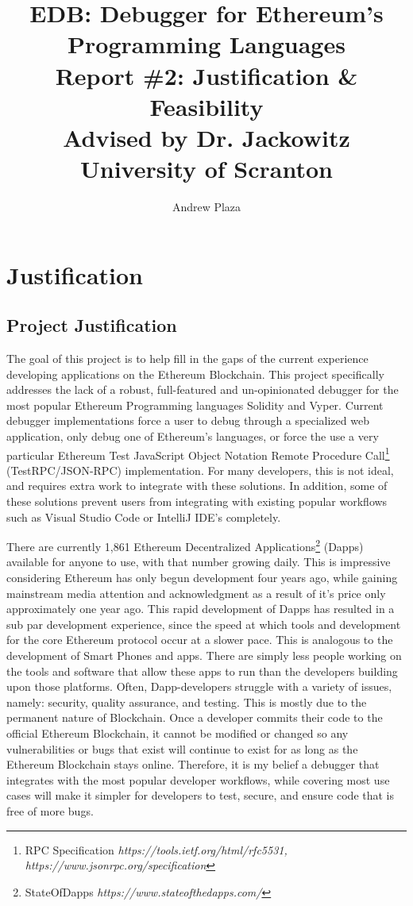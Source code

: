 \documentclass[]{report}
\title{%
	EDB: Debugger for Ethereum's Programming Languages \\
	\medskip
	\large Report \#2: Justification \& Feasibility \\
	\large Advised by Dr. Jackowitz	\\
	\large University of Scranton}
\author{Andrew Plaza}
\begin{document}
\maketitle
\tableofcontents
\newpage

\section {Justification}
\subsection{Project Justification}
The goal of this project is to help fill in the gaps of the current experience developing applications on the Ethereum Blockchain. This project specifically addresses the lack of a robust, full-featured and un-opinionated debugger for the most popular Ethereum Programming languages Solidity and Vyper. Current debugger implementations force a user to debug through a specialized web application, only debug one of Ethereum's languages, or force the use a very particular Ethereum Test JavaScript Object Notation Remote Procedure Call\footnote{RPC Specification \textit{https://tools.ietf.org/html/rfc5531, https://www.jsonrpc.org/specification}} (TestRPC/JSON-RPC) implementation. For many developers, this is not ideal, and requires extra work to integrate with these solutions. In addition, some of these solutions prevent users from integrating with existing popular workflows such as Visual Studio Code or IntelliJ IDE's completely. 


There are currently 1,861 Ethereum Decentralized Applications\footnote{StateOfDapps \textit {https://www.stateofthedapps.com/}} (Dapps) available for anyone to use, with that number growing daily. This is impressive considering Ethereum has only begun development four years ago, while gaining mainstream media attention and acknowledgment as a result of it's price only approximately one year ago. This rapid development of Dapps has resulted in a sub par development experience, since the speed at which tools and development for the core Ethereum protocol occur at a slower pace. This is analogous to the development of Smart Phones and apps. There are simply less people working on the tools and software that allow these apps to run than the developers building upon those platforms. Often, Dapp-developers struggle with a variety of issues, namely: security, quality assurance, and testing. This is mostly due to the permanent nature of Blockchain. Once a developer commits their code to the official Ethereum Blockchain, it cannot be modified or changed so any vulnerabilities or bugs that exist will continue to exist for as long as the Ethereum Blockchain stays online. Therefore, it is my belief a debugger that integrates with the most popular developer workflows, while covering most use cases will make it simpler for developers to test, secure, and ensure code that is free of more bugs.
\end{document}

